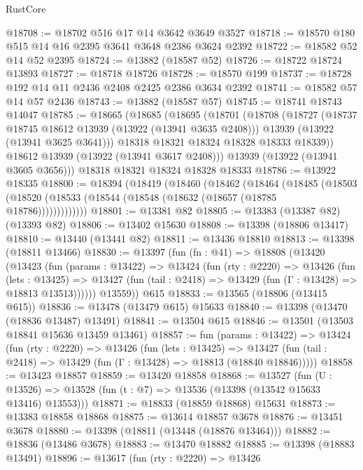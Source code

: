 \begin{lexlean}{RustCore}
\begin{coremodule}
@18708 := @18702 @516 @17 @14 @3642 @3649 @3527
@18718 := @18570 @180 @515 @14 @16 @2395 @3641 @3648 @2386 @3624 @2392
@18722 := @18582 @52 @14 @52 @2395
@18724 := @13882 (@18587 @52)
@18726 := @18722 @18724 @13893
@18727 := @18718 @18726
@18728 := @18570 @199
@18737 := @18728 @192 @14 @11 @2436 @2408 @2425 @2386 @3634 @2392
@18741 := @18582 @57 @14 @57 @2436
@18743 := @13882 (@18587 @57)
@18745 := @18741 @18743 @14047
@18785 := @18665
    (@18685
      (@18695
        (@18701
          (@18708
            (@18727
              (@18737 @18745 @18612 @13939 (@13922 (@13941 @3635 @2408)))
              @13939
              (@13922 (@13941 @3625 @3641)))
            @18318
            @18321
            @18324
            @18328
            @18333
            @18339))
        @18612
        @13939
        (@13922 (@13941 @3617 @2408)))
      @13939
      (@13922 (@13941 @3605 @3656)))
    @18318
    @18321
    @18324
    @18328
    @18333
@18786 := @13922 @18335
@18800 := @18394
    (@18419
      (@18460
        (@18462
          (@18464
            (@18485
              (@18503 (@18520 (@18533 (@18544 (@18548 (@18632 (@18657 (@18785 @18786)))))))))))))
@18801 := @13381 @82
@18805 := @13383 (@13387 @82) (@13393 @82)
@18806 := @13402 @15630
@18808 := @13398 (@18806 @13417)
@18810 := @13440 (@13441 @82)
@18811 := @13436 @18810
@18813 := @13398 (@18811 @13466)
@18830 := @13397
    (fun (fn : @41) =>
    @18808
      (@13420
        (@13423
          (fun (params : @13422) =>
          @13424
            (fun (rty : @2220) =>
            @13426
              (fun (lets : @13425) =>
              @13427 (fun (tail : @2418) => @13429 (fun (Γ : @13428) => @18813 @13513))))))
        @13559))
    @615
@18833 := @13565 (@18806 (@13415 @615))
@18836 := @13478 (@13479 @615) @15633
@18840 := @13398 (@13470 (@18836 @13487) @13491)
@18841 := @13504 @615
@18846 := @13501 (@13503 @18841 @15636 @13459 @13461)
@18857 := fun (params : @13422) =>
  @13424
    (fun (rty : @2220) =>
    @13426
      (fun (lets : @13425) =>
      @13427 (fun (tail : @2418) => @13429 (fun (Γ : @13428) => @18813 (@18840 @18846)))))
@18858 := @13423 @18857
@18859 := @13420 @18858
@18868 := @13527
    (fun (U : @13526) => @13528 (fun (t : @7) => @13536 (@13398 (@13542 @15633 @13416) @13553)))
@18871 := @18833 (@18859 @18868) @15631
@18873 := @13383 @18858 @18868
@18875 := @13614 @18857 @3678
@18876 := @13451 @3678
@18880 := @13398 (@18811 (@13448 (@18876 @13464)))
@18882 := @18836 (@13486 @3678)
@18883 := @13470 @18882
@18885 := @13398 (@18883 @13491)
@18896 := @13617
    (fun (rty : @2220) =>
    @13426

\end{coremodule}
\end{lexlean}
